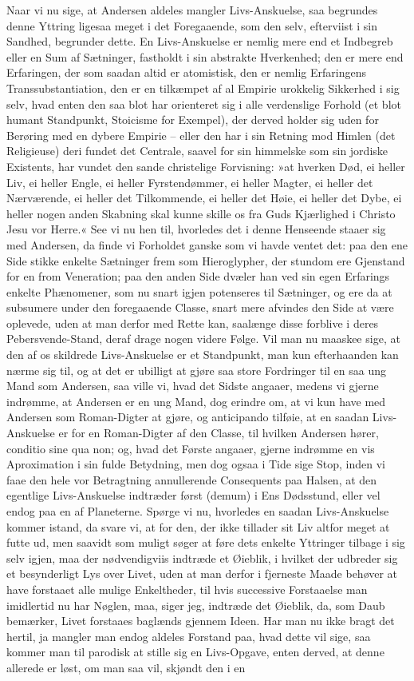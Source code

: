 \documentclass[12pt,a4paper]{article}
\begin{document}
Naar vi nu sige, at Andersen aldeles mangler Livs-Anskuelse, saa begrundes denne Yttring ligesaa meget i det Foregaaende, som den selv, efterviist i sin Sandhed, begrunder dette. En Livs-Anskuelse er nemlig mere end et Indbegreb eller en Sum af Sætninger, fastholdt i sin abstrakte Hverkenhed; den er mere end Erfaringen, der som saadan altid er atomistisk, den er nemlig Erfaringens Transsubstantiation, den er en tilkæmpet af al Empirie urokkelig Sikkerhed i sig selv, hvad enten den saa blot har orienteret sig i alle verdenslige Forhold (et blot humant Standpunkt, Stoicisme for Exempel), der derved holder sig uden for Berøring med en dybere Empirie – eller den har i sin Retning mod Himlen (det Religieuse) deri fundet det Centrale, saavel for sin himmelske som sin jordiske Existents, har vundet den sande christelige Forvisning: »at hverken Død, ei heller Liv, ei heller Engle, ei heller Fyrstendømmer, ei heller Magter, ei heller det Nærværende, ei heller det Tilkommende, ei heller det Høie, ei heller det Dybe, ei heller nogen anden Skabning skal kunne skille os fra Guds Kjærlighed i Christo Jesu vor Herre.« See vi nu hen til, hvorledes det i denne Henseende staaer sig med Andersen, da finde vi Forholdet ganske som vi havde ventet det: paa den ene Side stikke enkelte Sætninger frem som Hieroglypher, der stundom ere Gjenstand for en from Veneration; paa den anden Side dvæler han ved sin egen Erfarings enkelte Phænomener, som nu snart igjen potenseres til Sætninger, og ere da at subsumere under den foregaaende Classe, snart mere afvindes den Side at være oplevede, uden at man derfor med Rette kan, saalænge disse forblive i deres Pebersvende-Stand, deraf drage nogen videre Følge. Vil man nu maaskee sige, at den af os skildrede Livs-Anskuelse er et Standpunkt, man kun efterhaanden kan nærme sig til, og at det er ubilligt at gjøre saa store Fordringer til en saa ung Mand som Andersen, saa ville vi, hvad det Sidste angaaer, medens vi gjerne indrømme, at Andersen er en ung Mand, dog erindre om, at vi kun have med Andersen som Roman-Digter at gjøre, og anticipando tilføie, at en saadan Livs-Anskuelse er for en Roman-Digter af den Classe, til hvilken Andersen hører, conditio sine qua non; og, hvad det Første angaaer, gjerne indrømme en vis Aproximation i sin fulde Betydning, men dog ogsaa i Tide sige Stop, inden vi faae den hele vor Betragtning annullerende Consequents paa Halsen, at den egentlige Livs-Anskuelse indtræder først (demum) i Ens Dødsstund, eller vel endog paa en af Planeterne. Spørge vi nu, hvorledes en saadan Livs-Anskuelse kommer istand, da svare vi, at for den, der ikke tillader sit Liv altfor meget at futte ud, men saavidt som muligt søger at føre dets enkelte Yttringer tilbage i sig selv igjen, maa der nødvendigviis indtræde et Øieblik, i hvilket der udbreder sig et besynderligt Lys over Livet, uden at man derfor i fjerneste Maade behøver at have forstaaet alle mulige Enkeltheder, til hvis successive Forstaaelse man imidlertid nu har Nøglen, maa, siger jeg, indtræde det Øieblik, da, som Daub bemærker, Livet forstaaes baglænds gjennem Ideen. Har man nu ikke bragt det hertil, ja mangler man endog aldeles Forstand paa, hvad dette vil sige, saa kommer man til parodisk at stille sig en Livs-Opgave, enten derved, at denne allerede er løst, om man saa vil, skjøndt den i en 
\end{document}
